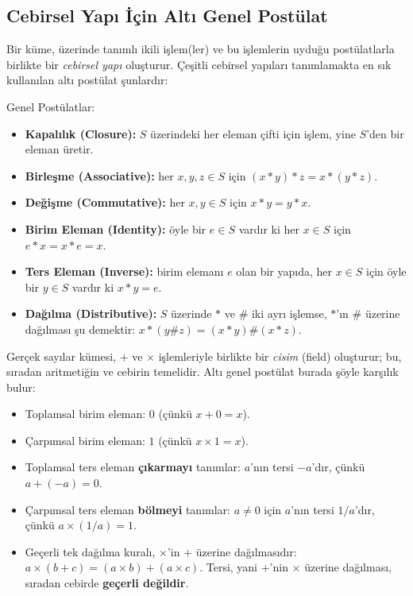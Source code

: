 \subsection{Cebirsel Yapı İçin Altı Genel Postülat}
\label{sec:genel-postulatlar}

Bir küme, üzerinde tanımlı ikili işlem(ler) ve bu işlemlerin uyduğu postülatlarla birlikte
bir \emph{cebirsel yapı} oluşturur. Çeşitli cebirsel yapıları
tanımlamakta en sık kullanılan altı postülat şunlardır:

\begin{tanim}{Genel Postülatlar:}
\begin{itemize}[nosep, leftmargin=*]
    \item \textbf{Kapalılık (Closure):} $S$ üzerindeki her eleman çifti için işlem, yine
    $S$'den bir eleman üretir.
    \item \textbf{Birleşme (Associative):} her $x,y,z\in S$ için $(x*y)*z=x*(y*z)$.
    \item \textbf{Değişme (Commutative):} her $x,y\in S$ için $x*y=y*x$.
    \item \textbf{Birim Eleman (Identity):} öyle bir $e\in S$ vardır ki her $x\in S$ için
    $e*x=x*e=x$.
    \item \textbf{Ters Eleman (Inverse):} birim elemanı $e$ olan bir yapıda, her $x\in S$
    için öyle bir $y\in S$ vardır ki $x*y=e$.
    \item \textbf{Dağılma (Distributive):} $S$ üzerinde $*$ ve $\#$ iki ayrı işlemse, $*$'ın
    $\#$ üzerine dağılması şu demektir: $x*(y\#z)=(x*y)\#(x*z)$.
\end{itemize}
\end{tanim}

\begin{ornek}
Gerçek sayılar kümesi, $+$ ve $\times$ işlemleriyle birlikte bir \emph{cisim}
(field) oluşturur; bu, sıradan aritmetiğin ve cebirin temelidir. Altı genel postülat burada
şöyle karşılık bulur:
\begin{itemize}[nosep, leftmargin=*]
    \item Toplamsal birim eleman: $0$ (çünkü $x+0=x$).
    \item Çarpımsal birim eleman: $1$ (çünkü $x\times 1=x$).
    \item Toplamsal ters eleman \textbf{çıkarmayı} tanımlar: $a$'nın tersi $-a$'dır, çünkü
    $a+(-a)=0$.
    \item Çarpımsal ters eleman \textbf{bölmeyi} tanımlar: $a\neq 0$ için $a$'nın tersi
    $1/a$'dır, çünkü $a\times(1/a)=1$.
    \item Geçerli tek dağılma kuralı, $\times$'in $+$ üzerine dağılmasıdır:
    $a\times(b+c)=(a\times b)+(a\times c)$. Tersi, yani $+$'nin $\times$ üzerine dağılması,
    sıradan cebirde \textbf{geçerli değildir}.
\end{itemize}
\end{ornek}

